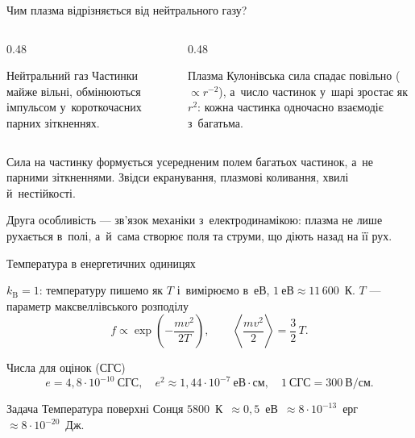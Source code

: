 \documentclass[]{beamer}
\newcommand{\cm}{\mathrm{см}}
\begin{document}
\begin{frame}{Чим плазма відрізняється від нейтрального газу?}
	\begin{columns}[T]
		\begin{column}{0.48\linewidth}
			\begin{block}{Нейтральний газ}\justifying\small
				Частинки майже вільні, обмінюються імпульсом у~короткочасних парних зіткненнях.
			\end{block}
		\end{column}
		\begin{column}{0.48\linewidth}
			\begin{block}{Плазма}\justifying\small
				Кулонівська сила спадає повільно ($\propto r^{-2}$), а~число частинок у~шарі зростає як $r^2$:
				кожна частинка \alert{одночасно} взаємодіє з~багатьма.
			\end{block}
		\end{column}
	\end{columns}
	\begin{block}{}\justifying\small
		Сила на частинку формується \alert{усередненим полем багатьох частинок}, а~не парними зіткненнями. Звідси
		екранування, плазмові коливання, хвилі й~нестійкості.
	\end{block}
	\begin{block}{}\justifying\small
		Друга особливість --- зв'язок механіки з~електродинамікою: плазма не лише рухається в~полі, а~й~сама
		створює поля та струми, що діють назад на її рух.
	\end{block}
\end{frame}

\begin{frame}{Температура в енергетичних одиницях}
	\begin{block}{}\justifying\small
		$k_{\mathrm B}=1$: температуру пишемо як $T$ і~вимірюємо в~еВ, $1~\text{еВ}\approx11\,600$~К.
		$T$ --- параметр максвеллівського розподілу
		\begin{equation*}
			f\propto\exp\left(-\frac{mv^2}{2T}\right),\qquad
			\left\langle\frac{mv^2}{2}\right\rangle=\frac32\,T.
		\end{equation*}
	\end{block}
	\begin{block}{Числа для оцінок (СГС)}\small
		\begin{equation*}
			e=4{,}8\cdot10^{-10}~\text{СГС},\quad
			e^2\approx1{,}44\cdot10^{-7}~\text{еВ}\cdot\cm,\quad
			1~\text{СГС}=300~\text{В/см}.
		\end{equation*}
	\end{block}
	\begin{exampleblock}{Задача}\small
		Температура поверхні Сонця $5800$~К~$\approx0{,}5$~еВ~$\approx8\cdot10^{-13}$~ерг~$\approx8\cdot10^{-20}$~Дж.
	\end{exampleblock}
\end{frame}
\end{document}
